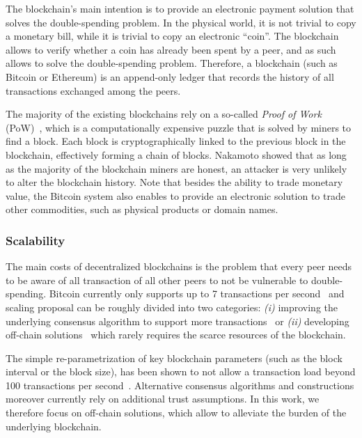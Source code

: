 \documentclass[sigconf]{acmart}
\begin{document}
The blockchain's main intention is to provide an electronic payment solution that solves the double-spending problem. In the physical world, it is not trivial to copy a monetary bill, while it is trivial to copy an electronic ``coin''. The blockchain allows to verify whether a coin has already been spent by a peer, and as such allows to solve the double-spending problem. Therefore, a blockchain (such as Bitcoin or Ethereum) is an append-only ledger that records the history of all transactions exchanged among the peers.

The majority of the existing blockchains rely on a so-called \emph{Proof of Work} (PoW)~\cite{Dwork1993,Back02hashcash}, which is a computationally expensive puzzle that is solved by miners to find a block. Each block is cryptographically linked to the previous block in the blockchain, effectively forming a chain of blocks. Nakamoto showed that as long as the majority of the blockchain miners are honest, an attacker is very unlikely to alter the blockchain history. Note that besides the ability to trade monetary value, the Bitcoin system also enables to provide an electronic solution to trade other commodities, such as physical products or domain names.

\subsubsection{Scalability}
The main costs of decentralized blockchains is the problem that every peer needs to be aware of all transaction of all other peers to not be vulnerable to double-spending. Bitcoin currently only supports up to 7 transactions per second~\cite{croman2016scaling} and scaling proposal can be roughly divided into two categories: \emph{(i)} improving the underlying consensus algorithm to support more transactions~\cite{kogias2016enhancing, luu2015scp, pass2016hybrid, eyal2016bitcoin} or \emph{(ii)} developing off-chain solutions~\cite{flare,sprites,lightning,raiden} which rarely requires the scarce resources of the blockchain.

The simple re-parametrization of key blockchain parameters (such as the block interval or the block size), has been shown to not allow a transaction load beyond 100 transactions per second~\cite{gervais2016security}. Alternative consensus algorithms and constructions moreover currently rely on additional trust assumptions. In this work, we therefore focus on off-chain solutions, which allow to alleviate the burden of the underlying blockchain.
\end{document}
